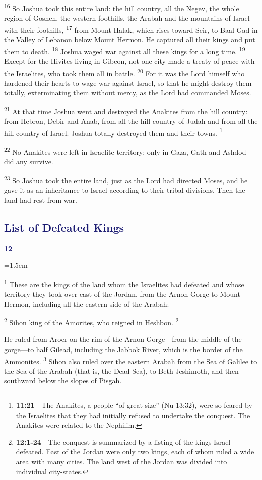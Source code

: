 \documentclass[12pt,twoside]{article}
\newcommand{\vs}[1]{\textsuperscript{#1}}
\newcommand{\vnote}[2]{%
  \begingroup
  \renewcommand\thefootnote{}%
  \footnote{\scriptsize \textbf{}#2}%
  \addtocounter{footnote}{-1}%
  \endgroup
}
\newcommand{\chapterWithBigIndent}[2]{%
  \noindent
  \begin{minipage}[t]{1cm}
    \vspace{-0.4\baselineskip}
    {\textcolor{MidnightBlue}{\fontsize{40pt}{48pt}\selectfont \textbf{#1}}}
  \end{minipage}%
  \hspace{0.9cm}%
  \begin{minipage}[t]{\dimexpr\linewidth - 1.5cm - 0.3cm\relax}
    \hangindent=1.5em
    \hangafter=3
    #2
    \vspace{0.05cm}
  \end{minipage}
}
\begin{document}
\vs{16} So Joshua took this entire land: the hill country, all the Negev, the whole region of Goshen, the western foothills, the Arabah and the mountains of Israel with their foothills,
\vs{17} from Mount Halak, which rises toward Seir, to Baal Gad in the Valley of Lebanon below Mount Hermon. He captured all their kings and put them to death.
\vs{18} Joshua waged war against all these kings for a long time.
\vs{19} Except for the Hivites living in Gibeon, not one city made a treaty of peace with the Israelites, who took them all in battle.
\vs{20} For it was the Lord himself who hardened their hearts to wage war against Israel, so that he might destroy them totally, exterminating them without mercy, as the Lord had commanded Moses.

\vs{21} At that time Joshua went and destroyed the Anakites from the hill country: from Hebron, Debir and Anab, from all the hill country of Judah and from all the hill country of Israel. Joshua totally destroyed them and their towns.\vnote{21}{\textbf{11:21} - The Anakites, a people “of great size” (Nu 13:32), were so feared by the Israelites that they had initially refused to undertake the conquest. The Anakites were related to the Nephilim.}
\vs{22} No Anakites were left in Israelite territory; only in Gaza, Gath and Ashdod did any survive.

\vs{23} So Joshua took the entire land, just as the Lord had directed Moses, and he gave it as an inheritance to Israel according to their tribal divisions. Then the land had rest from war.

\subsection*{\textcolor{MidnightBlue}{\textbf{List of Defeated Kings}}}

\chapterWithBigIndent{12}{
  \vs{1} These are the kings of the land whom the Israelites had defeated and whose territory they took over east of the Jordan, from the Arnon Gorge to Mount Hermon, including all the eastern side of the Arabah:
}

\noindent \vs{2} Sihon king of the Amorites, who reigned in Heshbon.\vspace{0.3cm}\vnote{1}{\textbf{12:1-24} - The conquest is summarized by a listing of the kings Israel defeated. East of the Jordan were only two kings, each
of whom ruled a wide area with many cities. The land west of the Jordan was divided into individual city-states.}

\begin{adjustwidth}{0.5cm}{0cm}
  He ruled from Aroer on the rim of the Arnon Gorge---from the middle of the gorge---to half Gilead, including the Jabbok River, which is the border of the Ammonites.
  \vs{3} Sihon also ruled over the eastern Arabah from the Sea of Galilee to the Sea of the Arabah (that is, the Dead Sea), to Beth Jeshimoth, and then southward below the slopes of Pisgah.\vspace{0.3cm}
\end{adjustwidth}
\end{document}
